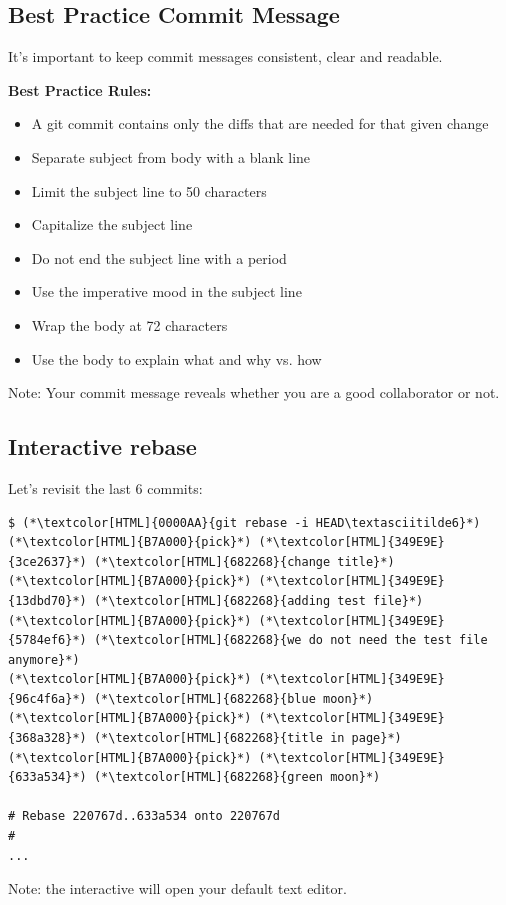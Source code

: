 \subsection{Best Practice Commit Message}
\begin{frame}[fragile]
  \subslidetitle

  It's important to keep commit messages consistent, clear and readable.
  \vspace{1em}

  \textbf{Best Practice Rules:}
  \begin{itemize}
    \item A git commit contains only the diffs that are needed for that given change
    \item Separate subject from body with a blank line
    \item Limit the subject line to 50 characters
    \item Capitalize the subject line
    \item Do not end the subject line with a period
    \item Use the imperative mood in the subject line
    \item Wrap the body at 72 characters
    \item Use the body to explain what and why vs. how
  \end{itemize}

  \vspace{1em}
  Note: Your commit message reveals whether you are a good collaborator or not.
\end{frame}

\subsection{Interactive rebase}
\begin{frame}[fragile]
  \subslidetitle

  Let's revisit the last 6 commits:
  \begin{lstlisting}
$ (*\textcolor[HTML]{0000AA}{git rebase -i HEAD\textasciitilde6}*)
(*\textcolor[HTML]{B7A000}{pick}*) (*\textcolor[HTML]{349E9E}{3ce2637}*) (*\textcolor[HTML]{682268}{change title}*)
(*\textcolor[HTML]{B7A000}{pick}*) (*\textcolor[HTML]{349E9E}{13dbd70}*) (*\textcolor[HTML]{682268}{adding test file}*)
(*\textcolor[HTML]{B7A000}{pick}*) (*\textcolor[HTML]{349E9E}{5784ef6}*) (*\textcolor[HTML]{682268}{we do not need the test file anymore}*)
(*\textcolor[HTML]{B7A000}{pick}*) (*\textcolor[HTML]{349E9E}{96c4f6a}*) (*\textcolor[HTML]{682268}{blue moon}*)
(*\textcolor[HTML]{B7A000}{pick}*) (*\textcolor[HTML]{349E9E}{368a328}*) (*\textcolor[HTML]{682268}{title in page}*)
(*\textcolor[HTML]{B7A000}{pick}*) (*\textcolor[HTML]{349E9E}{633a534}*) (*\textcolor[HTML]{682268}{green moon}*)

# Rebase 220767d..633a534 onto 220767d
#
...
\end{lstlisting}

  Note: the interactive  will open your default text editor.
\end{frame}

